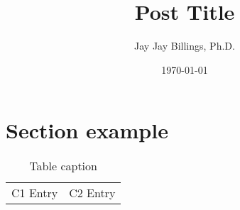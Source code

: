 \documentclass{article}
\title{Post Title}
\author{Jay Jay Billings, Ph.D.}
\date{\today}
\begin{document}
\maketitle

\section*{Section example}

\begin{table}[h!]
\centering
\begin{tabularx}{ 0.8\textwidth }{ | >{\raggedright\arraybackslash}X | >{\centering\arraybackslash}X | }
 \hline
 \multicolumn{2}{|c|}{Table title} \\
 \hline
 C1 Entry & C2 Entry \\
 \hline
\end{tabularx}
\caption{Table caption}
\end{table}
\end{document}
